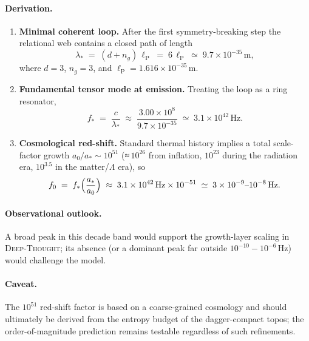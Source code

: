 \documentclass{article}
\begin{document}
\paragraph{Derivation.}

\begin{enumerate}
  \item \textbf{Minimal coherent loop.}  
        After the first symmetry-breaking step the relational web
        contains a closed path of length
        \[
          \lambda_* \;=\; (d+n_g)\,\ell_{\mathrm P}
                     \;=\; 6\,\ell_{\mathrm P}
                     \;\simeq\;9.7\times10^{-35}\,\text{m},
        \]
        where \(d=3\), \(n_g=3\), and
        \(\ell_{\mathrm P}=1.616\times10^{-35}\,\text{m}\).
  \item \textbf{Fundamental tensor mode at emission.}  
        Treating the loop as a ring resonator,
        \[
          f_* \;=\;\frac{c}{\lambda_*}
               \;\approx\;\frac{3.00\times10^{8}}
                               {9.7\times10^{-35}}
               \;\simeq\;3.1\times10^{42}\,\text{Hz}.
        \]
  \item \textbf{Cosmological red-shift.}  
        Standard thermal history implies a total scale-factor growth  
        \(a_0/a_* \sim 10^{51}\)  
        (≈\,$10^{26}$ from inflation, \(10^{23}\) during the radiation
        era, \(10^{3.5}\) in the matter/\(\Lambda\) era), so
        \[
          f_0 \;=\; f_* \Bigl(\frac{a_*}{a_0}\Bigr)
               \;\approx\;3.1\times10^{42}\,\text{Hz}\times10^{-51}
               \;\simeq\;3\times10^{-9}\text{--}10^{-8}\,\text{Hz}.
        \]
\end{enumerate}

\paragraph{Observational outlook.}
A broad peak in this decade band would support the growth-layer scaling
in \textsc{Deep-Thought}; its absence (or a dominant peak far outside
\(10^{-10}\!-\!10^{-6}\,\mathrm{Hz}\)) would challenge the model.

\paragraph{Caveat.}
The \(10^{51}\) red-shift factor is based on a coarse-grained cosmology
and should ultimately be derived from the entropy budget of the
dagger-compact topos; the order-of-magnitude prediction remains
testable regardless of such refinements.
\end{document}
